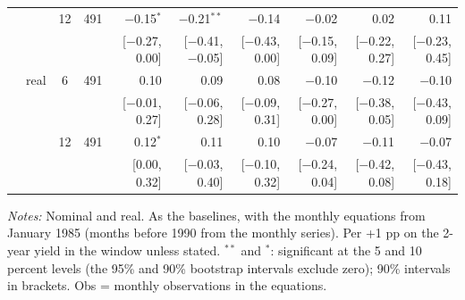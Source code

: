 \begin{longtable}{llcrrrrrrr}
 &  & 12 & 491 & $-$0.15$^{*}$ & $-$0.21$^{**}$ & $-$0.14 & $-$0.02 & 0.02 & 0.11\\
 & & & & {\scriptsize [$-$0.27, 0.00]} & {\scriptsize [$-$0.41, $-$0.05]} & {\scriptsize [$-$0.43, 0.00]} & {\scriptsize [$-$0.15, 0.09]} & {\scriptsize [$-$0.22, 0.27]} & {\scriptsize [$-$0.23, 0.45]}\\
 & real & 6 & 491 & 0.10 & 0.09 & 0.08 & $-$0.10 & $-$0.12 & $-$0.10\\
 & & & & {\scriptsize [$-$0.01, 0.27]} & {\scriptsize [$-$0.06, 0.28]} & {\scriptsize [$-$0.09, 0.31]} & {\scriptsize [$-$0.27, 0.00]} & {\scriptsize [$-$0.38, 0.05]} & {\scriptsize [$-$0.43, 0.09]}\\
 &  & 12 & 491 & 0.12$^{*}$ & 0.11 & 0.10 & $-$0.07 & $-$0.11 & $-$0.07\\
 & & & & {\scriptsize [0.00, 0.32]} & {\scriptsize [$-$0.03, 0.40]} & {\scriptsize [$-$0.10, 0.32]} & {\scriptsize [$-$0.24, 0.04]} & {\scriptsize [$-$0.42, 0.08]} & {\scriptsize [$-$0.43, 0.18]}\\
\end{longtable}
\begin{flushleft}\footnotesize\textit{Notes:} Nominal and real. As the baselines, with the monthly equations from January 1985 (months before 1990 from the monthly series). Per +1 pp on the 2-year yield in the window unless stated. $^{**}$ and $^{*}$: significant at the 5 and 10 percent levels (the 95\% and 90\% bootstrap intervals exclude zero); 90\% intervals in brackets. Obs = monthly observations in the equations.\end{flushleft}
\endgroup
